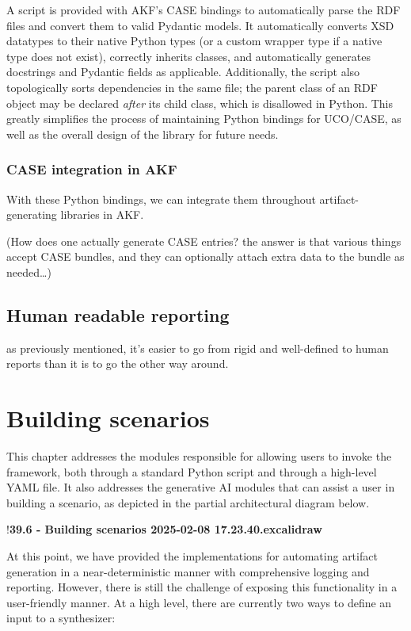 \documentclass[letterpaper,12pt]{report}
\begin{document}
A script is provided with AKF's CASE bindings to automatically parse the
RDF files and convert them to valid Pydantic models. It automatically
converts XSD datatypes to their native Python types (or a custom wrapper
type if a native type does not exist), correctly inherits classes, and
automatically generates docstrings and Pydantic fields as applicable.
Additionally, the script also topologically sorts dependencies in the
same file; the parent class of an RDF object may be declared
\emph{after} its child class, which is disallowed in Python. This
greatly simplifies the process of maintaining Python bindings for
UCO/CASE, as well as the overall design of the library for future needs.

\subsection{CASE integration in
AKF}\label{case-integration-in-akf}

With these Python bindings, we can integrate them throughout
artifact-generating libraries in AKF.

(How does one actually generate CASE entries? the answer is that various
things accept CASE bundles, and they can optionally attach extra data to
the bundle as needed\ldots)

\section{Human readable reporting}\label{human-readable-reporting}

as previously mentioned, it's easier to go from rigid and well-defined
to human reports than it is to go the other way around.

\chapter{Building scenarios}\label{chapter-six}

This chapter addresses the modules responsible for allowing users to
invoke the framework, both through a standard Python script and through
a high-level YAML file. It also addresses the generative AI modules that
can assist a user in building a scenario, as depicted in the partial
architectural diagram below.

!\textbf{39.6 - Building scenarios 2025-02-08 17.23.40.excalidraw}

At this point, we have provided the implementations for automating
artifact generation in a near-deterministic manner with comprehensive
logging and reporting. However, there is still the challenge of exposing
this functionality in a user-friendly manner. At a high level, there are
currently two ways to define an input to a synthesizer:
\end{document}
